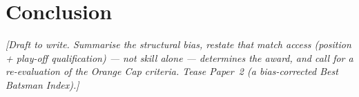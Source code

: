 \documentclass[11pt]{article}
\newcommand{\authornote}[1]{{\color{red}\textit{[#1]}}}
\begin{document}
\section{Conclusion}
\label{sec:conclusion}

\authornote{Draft to write. Summarise the structural bias, restate that match access
(position + play-off qualification) --- not skill alone --- determines the award, and
call for a re-evaluation of the Orange Cap criteria. Tease Paper~2 (a bias-corrected
Best Batsman Index).}



\end{document}
